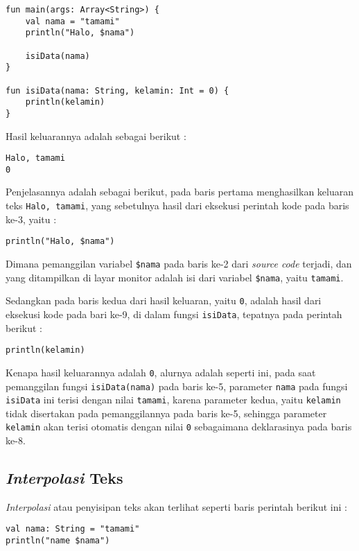 \begin{lstlisting}
fun main(args: Array<String>) {
	val nama = "tamami"
	println("Halo, $nama")
	
	isiData(nama)
}

fun isiData(nama: String, kelamin: Int = 0) {
	println(kelamin)
}
\end{lstlisting}

Hasil keluarannya adalah sebagai berikut :

\begin{lstlisting}
Halo, tamami
0
\end{lstlisting}

Penjelasannya adalah sebagai berikut, pada baris pertama menghasilkan keluaran teks \texttt{Halo, tamami}, yang sebetulnya hasil dari eksekusi perintah kode pada baris ke-3, yaitu :

\begin{lstlisting}
println("Halo, $nama")
\end{lstlisting}

Dimana pemanggilan variabel \texttt{\$nama} pada baris ke-2 dari \textit{source code} terjadi, dan yang ditampilkan di layar monitor adalah isi dari variabel \texttt{\$nama}, yaitu \texttt{tamami}.

Sedangkan pada baris kedua dari hasil keluaran, yaitu \texttt{0}, adalah hasil dari eksekusi kode pada bari ke-9, di dalam fungsi \texttt{isiData}, tepatnya pada perintah berikut :

\begin{lstlisting}
println(kelamin)
\end{lstlisting}

Kenapa hasil keluarannya adalah \texttt{0}, alurnya adalah seperti ini, pada saat pemanggilan fungsi \texttt{isiData(nama)} pada baris ke-5, parameter \texttt{nama} pada fungsi \texttt{isiData} ini terisi dengan nilai \texttt{tamami}, karena parameter kedua, yaitu \texttt{kelamin} tidak disertakan pada pemanggilannya pada baris ke-5, sehingga parameter \texttt{kelamin} akan terisi otomatis dengan nilai \texttt{0} sebagaimana deklarasinya pada baris ke-8.

\subsection{\textit{Interpolasi} Teks}

\textit{Interpolasi} atau penyisipan teks akan terlihat seperti baris perintah berikut ini :

\begin{lstlisting}
val nama: String = "tamami"
println("name $nama")
\end{lstlisting}


